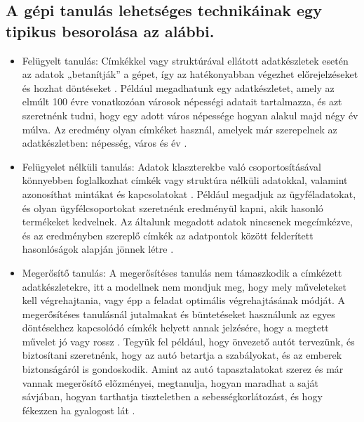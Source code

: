 \subsection{A gépi tanulás lehetséges technikáinak egy tipikus besorolása az alábbi.}
\begin{itemize}
    \item Felügyelt tanulás: Címkékkel vagy struktúrával ellátott adatkészletek esetén az adatok „betanítják” a gépet, így az hatékonyabban végezhet előrejelzéseket és hozhat döntéseket \cite{machinelearningbasics}. Például megadhatunk egy adatkészletet, amely az elmúlt 100 évre vonatkozóan városok népességi adatait tartalmazza, és azt szeretnénk tudni, hogy egy adott város népessége hogyan alakul majd négy év múlva. Az eredmény olyan címkéket használ, amelyek már szerepelnek az adatkészletben: népesség, város és év \cite{machinelearningalgorithms}.
    \item Felügyelet nélküli tanulás: Adatok klaszterekbe való csoportosításával könnyebben foglalkozhat címkék vagy struktúra nélküli adatokkal, valamint azonosíthat mintákat és kapcsolatokat \cite{machinelearningbasics}. Például megadjuk az ügyféladatokat, és olyan ügyfélcsoportokat szeretnénk eredményül kapni, akik hasonló termékeket kedvelnek. Az általunk megadott adatok nincsenek megcímkézve, és az eredményben szereplő címkék az adatpontok között felderített hasonlóságok alapján jönnek létre \cite{machinelearningalgorithms}.
    \item Megerősítő tanulás: A megerősítéses tanulás nem támaszkodik a címkézett adatkészletekre, itt a modellnek nem mondjuk meg, hogy mely műveleteket kell végrehajtania, vagy épp a feladat optimális végrehajtásának módját. A megerősítéses tanulásnál jutalmakat és büntetéseket használunk az egyes döntésekhez kapcsolódó címkék helyett annak jelzésére, hogy a megtett művelet jó vagy rossz \cite{reinforcementlearning}. Tegyük fel például, hogy önvezető autót tervezünk, és biztosítani szeretnénk, hogy az autó betartja a szabályokat, és az emberek biztonságáról is gondoskodik. Amint az autó tapasztalatokat szerez és már vannak megerősítő előzményei, megtanulja, hogyan maradhat a saját sávjában, hogyan tarthatja tiszteletben a sebességkorlátozást, és hogy fékezzen ha gyalogost lát \cite{machinelearningalgorithms}.
\end{itemize}

